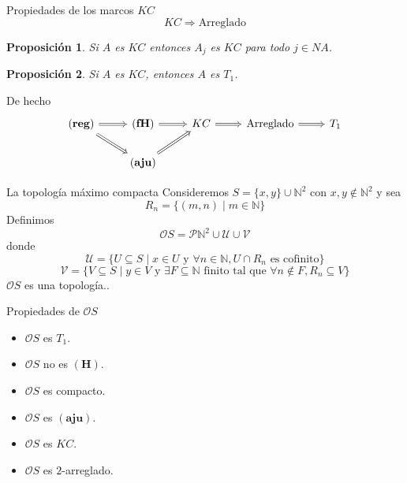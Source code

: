 \documentclass[compress,12pt]{beamer}
\newtheorem{prop}{Proposición}
\begin{document}
\begin{frame}[fragile]{Propiedades de los marcos $KC$}
\[
KC\Rightarrow \mbox{Arreglado}
\]

\begin{prop}
Si $A$ es $KC$ entonces $A_j$ es $KC$ para todo $j\in NA$.
\end{prop}

\begin{prop}
Si $A$ es $KC$, entonces $A$ es $T_1$.
\end{prop}

De hecho
\[\begin{tikzcd}
	{\mathbf{(reg)}} & {\mathbf{(fH)}} & KC & {\mbox{Arreglado}} & {T_1} \\
	& {\mathbf{(aju)}} && {}
	\arrow[Rightarrow, from=1-1, to=1-2]
	\arrow[Rightarrow, from=1-1, to=2-2]
	\arrow[Rightarrow, from=1-2, to=1-3]
	\arrow[Rightarrow, from=1-3, to=1-4]
	\arrow[Rightarrow, from=1-4, to=1-5]
	\arrow[Rightarrow, from=2-2, to=1-3]
\end{tikzcd}\]

\end{frame}

\begin{frame}{La topología máximo compacta}
Consideremos $S=\{x,y\}\cup \mathbb{N}^2$ con $x,y\notin \mathbb{N}^2$ y sea 
\[
R_n=\{(m,n)\mid m\in \mathbb{N}\}
\]
Definimos 
\[
\mathcal{O}S=\mathcal{P}\mathbb{N}^2 \cup \mathcal{U}\cup\mathcal{V}
\]
donde
\[
\mathcal{U}=\{U\subseteq S\mid x\in U\mbox{ y }\forall n\in \mathbb{N}, U\cap R_n\mbox{ es cofinito}\}
\]
\[
\mathcal{V}=\{V\subseteq S\mid y\in V \mbox{ y }\exists F\subseteq \mathbb{N}\mbox{ finito tal que }\forall n\notin F, R_n\subseteq V \}
\]
$\mathcal{O}S$ es una topología..
\end{frame}

\begin{frame}{Propiedades de $\mathcal{O}S$}
	\begin{itemize}
	\item $\mathcal{O}S$ es $T_1$.
	\item $\mathcal{O}S$ no es $\mathbf{(H)}$.
	\item $\mathcal{O}S$ es compacto.
	\item $\mathcal{O}S$ es $\mathbf{(aju)}$.
	\item $\mathcal{O}S$ es $KC$.
	\item $\mathcal{O}S$ es $2$-arreglado.
	\end{itemize}
\end{frame}
\end{document}
